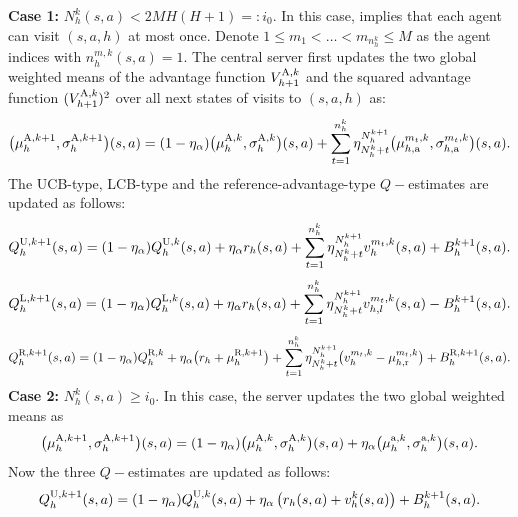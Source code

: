 \documentclass{article}
\newcommand{\U}{\textnormal{U}}
\newcommand{\LL}{\textnormal{L}}
\newcommand{\R}{\textnormal{R}}
\newcommand{\nr}{\textnormal{r}}
\newcommand{\A}{\textnormal{A}}
\newcommand{\na}{\textnormal{a}}
\begin{document}
\textbf{Case 1:} $N_h^k(s,a)< 2MH(H+1)=:i_0$. In this case,  implies that each agent can visit $(s,a,h)$ at most once. Denote $1\leq m_1<\ldots < m_{n_h^k}\leq M$ as the agent indices with $n_{h}^{m,k}(s,a)=1$. The central server first updates the two global weighted means of the advantage function $V_{h+1}^{\A,k}$ and the squared advantage function $(V_{h+1}^{\A,k})^2$ over all next states of visits to $(s,a,h)$ as:
    \begin{equation}\label{update_small_adv}
        \big(\mu_h^{\A, k+1},\sigma_h^{\A, k+1}\big)(s,a)= (1-\eta_{\alpha})\big(\mu_h^{\A, k}, \sigma_h^{\A, k}\big)(s,a) +\sum_{t = 1}^{n_h^k}\eta_{N_h^{k}+t}^{N_h^{k+1}}\big(\mu_{h,\na}^{m_t,k}, \sigma_{h,\na}^{m_t,k}\big)(s,a).
    \end{equation}
    The UCB-type, LCB-type \cite{li2023breaking} and the reference-advantage-type $Q-$estimates are updated as follows:
    \begin{equation}
        \label{update_q_small_u}
        Q_h^{\U, k+1}(s,a)= (1-\eta_{\alpha})Q_h^{\U,k}(s,a)+\eta_{\alpha}r_h(s,a) +\sum_{t = 1}^{n_h^k}\eta_{N_h^{k}+t}^{N_h^{k+1}}v_h^{m_t,k}(s,a)+ B_h^{k+1}(s,a).
    \end{equation}
    \begin{equation}
        \label{update_q_small_l}
        Q_h^{\LL, k+1}(s,a)= (1-\eta_{\alpha})Q_h^{\LL,k}(s,a)+\eta_{\alpha}r_h(s,a) +\sum_{t = 1}^{n_h^k}\eta_{N_h^{k}+t}^{N_h^{k+1}}v_{h,l}^{m_t,k}(s,a)- B_h^{k+1}(s,a).
    \end{equation}
    \begin{equation}
        \label{update_q_small_r}
        Q_h^{\R, k+1}(s,a) = (1-\eta_{\alpha})Q_h^{\R,k}
        +\eta_{\alpha}\big(r_h+\mu_h^{\R,k+1}\big) +\sum_{t = 1}^{n_h^k}\eta_{N_h^{k}+t}^{N_h^{k+1}}\big(v_h^{m_t,k}-\mu_{h,\nr}^{m_t,k}\big)+ B_h^{\R,k+1}(s,a).
    \end{equation}
  \textbf{Case 2:} $N_h^k(s,a)\geq i_0$. In this case, the server updates the two global weighted means as
    \begin{equation}
        \label{update_large_adv}
        \big(\mu_h^{\A, k+1},\sigma_h^{\A, k+1}\big)(s,a)= (1-\eta_{\alpha})\big(\mu_h^{\A, k}, \sigma_h^{\A, k}\big)(s,a) +\eta_{\alpha}\big(\mu_{h}^{\na,k}, \sigma_{h}^{\na,k}\big)(s,a).
    \end{equation}
    Now the three $Q-$estimates are updated as follows:
    \begin{equation}
        \label{update_q_large_u}
        Q_h^{\U, k+1}(s,a)= (1-\eta_{\alpha})Q_h^{\U,k}(s,a)+\eta_{\alpha}\left(r_h(s,a) +v_{h}^{k}(s,a)\right)+ B_h^{k+1}(s,a).
    \end{equation}
\end{document}
